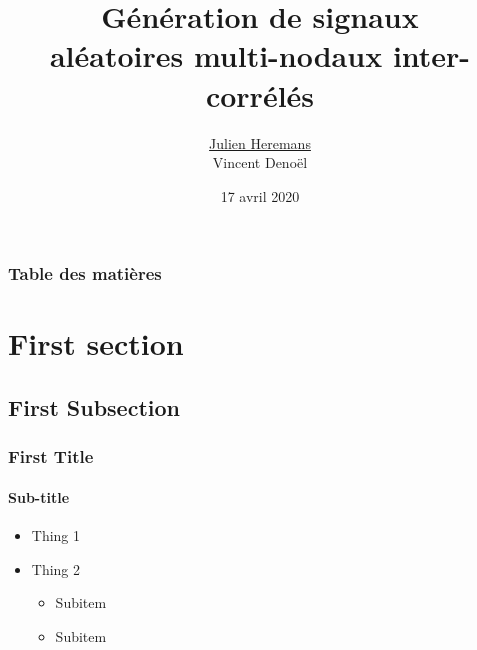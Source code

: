\documentclass[10pt]{beamer}
\begin{document}
	
	\title{Génération de signaux \\ aléatoires multi-nodaux inter-corrélés}
	\author{\begin{tabular}{c} \underline{Julien Heremans} \\ {Vincent Denoël}\end{tabular}}
	\date{\scriptsize 17 avril 2020}
	\def\confLogo{logos/uliege.png}
	
	
	
	
	\begin{frame}[plain]
	\maketitle
	\end{frame}




	\begin{frame}
	\frametitle{Table des matières}
	\tableofcontents
	\end{frame}

	\section{First section} %
	\subsection{First Subsection} %
	
	\begin{frame}
	\frametitle{First Title}
	\framesubtitle{Sub-title}
	
	\begin{itemize}[label=\itemOneA]
	\item Thing 1
	\item Thing 2
	\begin{itemize}[label=\itemOneB]
		\item Subitem
		\item Subitem
	\end{itemize}
	\end{itemize}
	
	\end{frame}
\end{document}
